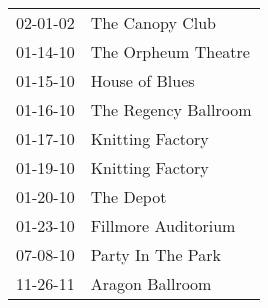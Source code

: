 \begin{supertabular}{p{0.07\textwidth}p{0.23\textwidth}}
 02-01-02 &       The Canopy Club \\
 01-14-10 &   The Orpheum Theatre \\
 01-15-10 &        House of Blues \\
 01-16-10 &  The Regency Ballroom \\
 01-17-10 &      Knitting Factory \\
 01-19-10 &      Knitting Factory \\
 01-20-10 &             The Depot \\
 01-23-10 &   Fillmore Auditorium \\
 07-08-10 &     Party In The Park \\
 11-26-11 &       Aragon Ballroom \\
\end{supertabular}
